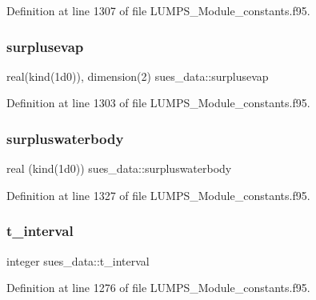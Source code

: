 Definition at line 1307 of file L\+U\+M\+P\+S\+\_\+\+Module\+\_\+constants.\+f95.

\mbox{\label{namespacesues__data_a08d117cca68ee0e84a8b286a038434c6}} 
\subsubsection{\texorpdfstring{surplusevap}{surplusevap}}
{\footnotesize\ttfamily real(kind(1d0)), dimension(2) sues\+\_\+data\+::surplusevap}



Definition at line 1303 of file L\+U\+M\+P\+S\+\_\+\+Module\+\_\+constants.\+f95.

\mbox{\label{namespacesues__data_ac93567a8ca56d05105523626613f5cc4}} 
\subsubsection{\texorpdfstring{surpluswaterbody}{surpluswaterbody}}
{\footnotesize\ttfamily real (kind(1d0)) sues\+\_\+data\+::surpluswaterbody}



Definition at line 1327 of file L\+U\+M\+P\+S\+\_\+\+Module\+\_\+constants.\+f95.

\mbox{\label{namespacesues__data_a91f69564eaa9aa824c0043d532502229}} 
\subsubsection{\texorpdfstring{t\+\_\+interval}{t\_interval}}
{\footnotesize\ttfamily integer sues\+\_\+data\+::t\+\_\+interval}



Definition at line 1276 of file L\+U\+M\+P\+S\+\_\+\+Module\+\_\+constants.\+f95.

\mbox{\label{namespacesues__data_a45028b146a251db48e2682b486211654}} 
